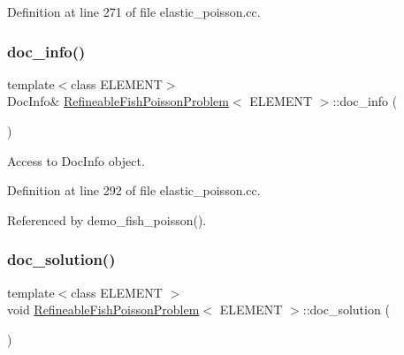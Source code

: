 Definition at line 271 of file elastic\+\_\+poisson.\+cc.

\mbox{\label{classRefineableFishPoissonProblem_a093f5963e63746843c33ca444a205333}} 
\subsubsection{\texorpdfstring{doc\+\_\+info()}{doc\_info()}}
{\footnotesize\ttfamily template$<$class E\+L\+E\+M\+E\+NT$>$ \\
Doc\+Info\& \hyperlink{classRefineableFishPoissonProblem}{Refineable\+Fish\+Poisson\+Problem}$<$ E\+L\+E\+M\+E\+NT $>$\+::doc\+\_\+info (\begin{DoxyParamCaption}{ }\end{DoxyParamCaption})\hspace{0.3cm}{\ttfamily [inline]}}



Access to Doc\+Info object. 



Definition at line 292 of file elastic\+\_\+poisson.\+cc.



Referenced by demo\+\_\+fish\+\_\+poisson().

\mbox{\label{classRefineableFishPoissonProblem_a6db25ff0bd3014aa531d9f0e8b385beb}} 
\subsubsection{\texorpdfstring{doc\+\_\+solution()}{doc\_solution()}}
{\footnotesize\ttfamily template$<$class E\+L\+E\+M\+E\+NT $>$ \\
void \hyperlink{classRefineableFishPoissonProblem}{Refineable\+Fish\+Poisson\+Problem}$<$ E\+L\+E\+M\+E\+NT $>$\+::doc\+\_\+solution (\begin{DoxyParamCaption}{ }\end{DoxyParamCaption})}



